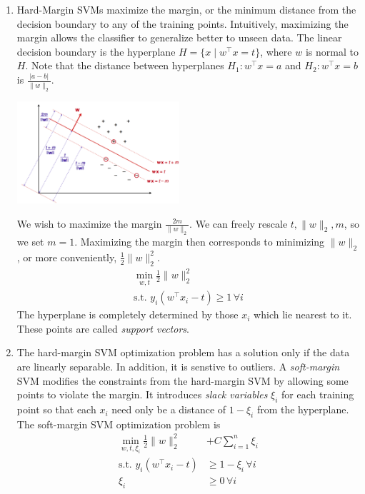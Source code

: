 \documentclass[10pt]{article}
\begin{document}
\begin{multicols}{2}
\begin{addmargin}[0.8em]{0.5em}
\begin{enumerate}[label=(\alph*)]
        \item Hard-Margin SVMs maximize the margin, or the minimum distance from the decision boundary to any of the training points. Intuitively, maximizing the margin allows the classifier to generalize better to unseen data. The linear decision boundary is the hyperplane $H = \{x \mid w^\top x = t \}$, where $w$ is normal to $H$. Note that the distance between hyperplanes $H_1: w^\top x = a$ and $H_2: w^\top x = b$ is $\frac{|a-b|}{\|w\|_2}$.
        \begin{center}
            \includegraphics[width=6cm]{svm.png}
        \end{center}
        We wish to maximize the margin $\frac{2m}{\| w \|_2}$. We can freely rescale $t, \|w\|_2, m$, so we set $m=1$. Maximizing the margin then corresponds to minimizing $\|w\|_2$, or more conveniently, $\frac{1}{2} \|w\|_2^2$. 
        \begin{align*}
            \min_{w, t} \frac{1}{2} \|w\|_2^2 \\
            \text{s.t. } y_i(w^\top x_i - t) \geq 1 \, \forall i
        \end{align*}
        The hyperplane is completely determined by those $x_i$ which lie nearest to it. These points are called \textit{support vectors}.
        
        \item The hard-margin SVM optimization problem has a solution only if the data are linearly separable. In addition, it is senstive to outliers. A \textit{soft-margin} SVM modifies the constraints from the hard-margin SVM by allowing some points to violate the margin. It introduces \textit{slack variables} $\xi_i$ for each training point so that each $x_i$ need only be a distance of $1-\xi_i$ from the hyperplane. The soft-margin SVM optimization problem is
        \begin{align*}
            \min_{w, t, \xi_i} \frac{1}{2} \|w\|_2^2 &+ C\sum_{i=1}^{n} \xi_i \\
            \text{s.t. } y_i(w^\top x_i - t) &\geq 1 - \xi_i \, \forall i \\
            \xi_i &\geq 0 \, \forall i
        \end{align*}
        

\end{enumerate}
\end{addmargin}
\end{multicols}
\end{document}
